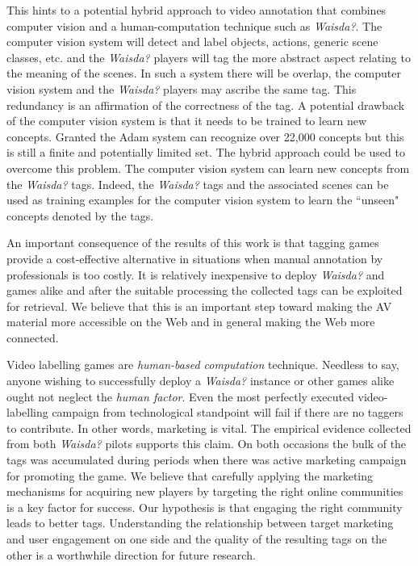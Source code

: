 This hints to a potential hybrid approach to video annotation that combines computer vision and a human-computation technique such as \textit{Waisda?}. The computer vision system will detect and label objects, actions, generic scene classes, etc. and the \textit{Waisda?} players will tag the more abstract aspect relating to the meaning of the scenes. In such a system there will be overlap, the computer vision system and the \textit{Waisda?} players may ascribe the same tag. This redundancy is an affirmation of the correctness of the tag. A potential drawback of the computer vision system is that it needs to be trained to learn new concepts. Granted the Adam system can recognize over 22,000 concepts but this is still a finite and potentially limited set. The hybrid approach could be used to overcome this problem. The computer vision system can learn new concepts from the \textit{Waisda?} tags. Indeed, the \textit{Waisda?} tags and the associated scenes can be used as training examples for the computer vision system to learn the ``unseen" concepts denoted by the tags.


An important consequence of the results of this work is that tagging games provide a cost-effective alternative in situations when manual annotation by professionals is too costly. It is relatively inexpensive to deploy \textit{Waisda?} and games alike and after the suitable processing the collected tags can be exploited for retrieval. We believe that this is an important step toward making the AV material more accessible on the Web and in general making the Web more connected.





Video labelling games are \textit{human-based computation} technique. Needless to say, anyone wishing to successfully deploy a \textit{Waisda?} instance or other games alike ought not neglect the \textit{human factor}. Even the most perfectly executed video-labelling campaign from technological standpoint will fail if there are no taggers to contribute. In other words, marketing is vital. The empirical evidence collected from both \textit{Waisda?} pilots supports this claim. On both occasions the bulk of the tags was accumulated during periods when there was active marketing campaign for promoting the game. We believe that carefully applying the marketing mechanisms for acquiring new players by targeting the right online communities is a key factor for success. Our hypothesis is that engaging the right community leads to better tags. Understanding the relationship between target marketing and user engagement on one side and the quality of the resulting tags on the other is a worthwhile direction for future research.

